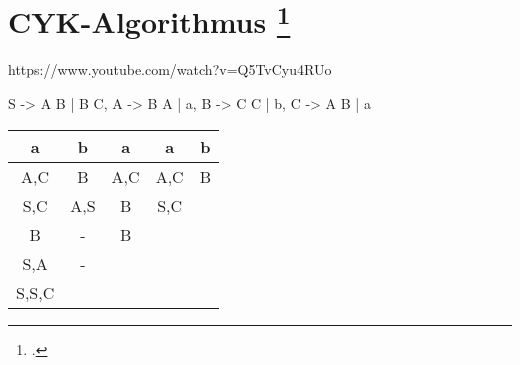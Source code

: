 \documentclass{lehramt-informatik-aufgabe}
\begin{document}
\section{CYK-Algorithmus
\footcite{}}

https://www.youtube.com/watch?v=Q5TvCyu4RUo

\begin{liProduktionsRegeln}
S -> A B | B C,
A -> B A | a,
B -> C C | b,
C -> A B | a
\end{liProduktionsRegeln}

\begin{liAntwort}
\begin{tabular}{|c|c|c|c|c|}
a   & b   & a   & a   & b \\\hline\hline
A,C & B   & A,C & A,C & B \\
S,C & A,S & B   & S,C \\
B   & -   & B \\
S,A & - \\
S,S,C \\
\end{tabular}
\end{liAntwort}
\end{document}
